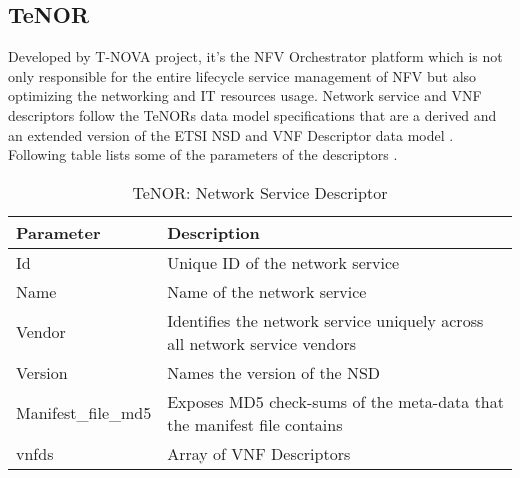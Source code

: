 \subsection{TeNOR}
Developed by T-NOVA project, it's the NFV Orchestrator platform which is not only responsible for the entire lifecycle service management of NFV but also optimizing the networking and IT resources usage. Network service and VNF descriptors follow the TeNORs data model specifications that are a derived and an extended version of the ETSI NSD and VNF Descriptor data model \cite{de2018network}. Following table lists some of the parameters of the descriptors \cite{TeNorSchemaDocumentation}.
    \begin{table}[h]
        \centering
    \begin{tabular}{ |p{4cm}|p{10cm}|}
        \hline
        \textbf{Parameter} & \textbf{Description} \\
        \hline
         
         Id & Unique ID of the network service \\
         \hline
         Name & Name of the network service \\
         \hline
         Vendor & Identifies the network service uniquely across all network service vendors \\
         \hline
         Version &  Names the version of the NSD \\
         \hline
         Manifest\_file\_md5 & Exposes MD5 check-sums of the meta-data that the manifest file contains \\
         \hline
         vnfds & Array of VNF Descriptors \\
         \hline
    \end{tabular}
        \caption{TeNOR: Network Service Descriptor}
    \label{tab:TeNOR_NSD_section}
 \end{table}
\newpage
